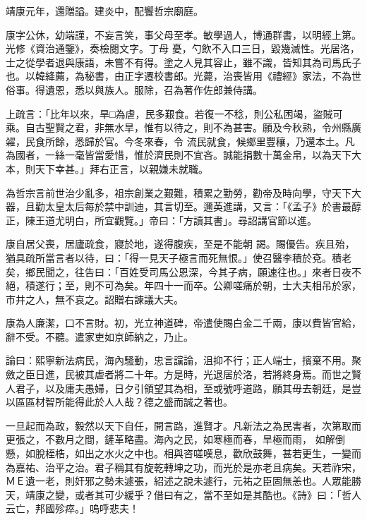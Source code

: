 \begin{pinyinscope}
 靖康元年，還贈謚。建炎中，配饗哲宗廟庭。



 康字公休，幼端謹，不妄言笑，事父母至孝。敏學過人，博通群書，以明經上第。光修《資治通鑒》，奏檢閱文字。丁母
 憂，勺飲不入口三日，毀幾滅性。光居洛，士之從學者退與康語，未嘗不有得。塗之人見其容止，雖不識，皆知其為司馬氏子也。以韓絳薦，為秘書，由正字遷校書郎。光薨，治喪皆用《禮經》家法，不為世俗事。得遺恩，悉以與族人。服除，召為著作佐郎兼侍講。



 上疏言：「比年以來，旱□為虐，民多艱食。若復一不稔，則公私困竭，盜賊可乘。自古聖賢之君，非無水旱，惟有以待之，則不為甚害。願及今秋熟，令州縣廣糴，民食所餘，悉歸於官。今冬來春，令
 流民就食，候鄉里豐穰，乃還本土。凡為國者，一絲一毫皆當愛惜，惟於濟民則不宜吝。誠能捐數十萬金帛，以為天下大本，則天下幸甚。」拜右正言，以親嫌未就職。



 為哲宗言前世治少亂多，祖宗創業之艱難，積累之勤勞，勸帝及時向學，守天下大器，且勸太皇太后每於禁中訓迪，其言切至。邇英進講，又言：「《孟子》於書最醇正，陳王道尤明白，所宜觀覽。」帝曰：「方讀其書」。尋詔講官節以進。



 康自居父喪，居廬疏食，寢於地，遂得腹疾，至是不能朝
 謁。賜優告。疾且殆，猶具疏所當言者以待，曰：「得一見天子極言而死無恨。」使召醫李積於兗。積老矣，鄉民聞之，往告曰：「百姓受司馬公恩深，今其子病，願速往也。」來者日夜不絕，積遂行；至，則不可為矣。年四十一而卒。公卿嗟痛於朝，士大夫相吊於家，市井之人，無不哀之。詔贈右諫議大夫。



 康為人廉潔，口不言財。初，光立神道碑，帝遣使賜白金二千兩，康以費皆官給，辭不受。不聽。遣家吏如京師納之，乃止。



 論曰：熙寧新法病民，海內騷動，忠言讜論，沮抑不行；正人端士，擯棄不用。聚斂之臣日進，民被其虐者將二十年。方是時，光退居於洛，若將終身焉。而世之賢人君子，以及庸夫愚婦，日夕引領望其為相，至或號呼道路，願其毋去朝廷，是豈以區區材智所能得此於人人哉？德之盛而誠之著也。



 一旦起而為政，毅然以天下自任，開言路，進賢才。凡新法之為民害者，次第取而更張之，不數月之間，鏟革略盡。海內之民，如寒極而春，旱極而雨，
 如解倒懸，如脫桎梏，如出之水火之中也。相與咨嗟嘆息，歡欣鼓舞，甚若更生，一變而為嘉祐、治平之治。君子稱其有旋乾轉坤之功，而光於是亦老且病矣。天若祚宋，ＭＥ遺一老，則奸邪之勢未遽張，紹述之說未遽行，元祐之臣固無恙也。人眾能勝天，靖康之變，或者其可少緩乎？借曰有之，當不至如是其酷也。《詩》曰：「哲人云亡，邦國殄瘁。」嗚呼悲夫！




\end{pinyinscope}
